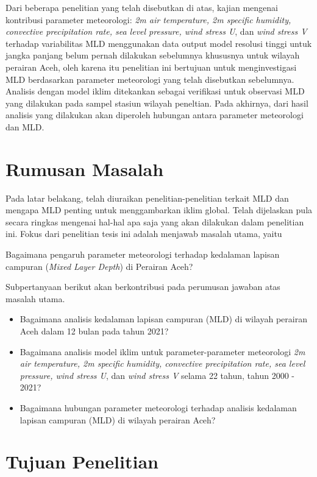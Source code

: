 \begin{spacing}{1.5}
	Dari beberapa penelitian yang telah disebutkan di atas, kajian mengenai kontribusi parameter meteorologi: \textit{2m air temperature, 2m specific humidity, convective precipitation rate, sea level pressure, wind stress U}, dan \textit{wind stress V} terhadap variabilitas MLD menggunakan data output model resolusi tinggi untuk jangka panjang belum pernah dilakukan sebelumnya khususnya untuk wilayah perairan Aceh, oleh karena itu penelitian ini bertujuan untuk menginvestigasi MLD berdasarkan parameter meteorologi yang telah disebutkan sebelumnya. Analisis dengan model iklim ditekankan sebagai verifikasi untuk observasi MLD yang dilakukan pada sampel stasiun wilayah peneltian. Pada akhirnya, dari hasil analisis yang dilakukan akan diperoleh hubungan antara parameter meteorologi dan MLD.
	
	\section[Rumusan Masalah]{Rumusan Masalah}
	Pada latar belakang, telah diuraikan penelitian-penelitian terkait MLD dan mengapa MLD penting untuk menggambarkan iklim global. Telah dijelaskan pula secara ringkas mengenai hal-hal apa saja yang akan dilakukan dalam penelitian ini. Fokus dari penelitian tesis ini adalah menjawab masalah utama, yaitu
	
	Bagaimana pengaruh parameter meteorologi terhadap kedalaman lapisan campuran (\textit{Mixed Layer Depth}) di Perairan Aceh?
	
	Subpertanyaan berikut akan berkontribusi pada perumusan jawaban atas masalah utama.
	\begin{itemize}
		\item Bagaimana analisis kedalaman lapisan campuran (MLD) di wilayah perairan Aceh dalam 12 bulan pada tahun 2021? 
		\item Bagaimana analisis model iklim untuk parameter-parameter meteorologi \textit{2m air temperature, 2m specific humidity, convective precipitation rate, sea level pressure, wind stress U}, dan \textit{wind stress V} selama 22 tahun, tahun 2000 - 2021?
		\item Bagaimana hubungan parameter meteorologi terhadap analisis kedalaman lapisan campuran (MLD) di wilayah perairan Aceh?
	\end{itemize}
	\section[Tujuan Penelitian]{Tujuan Penelitian}
	

\end{spacing}
